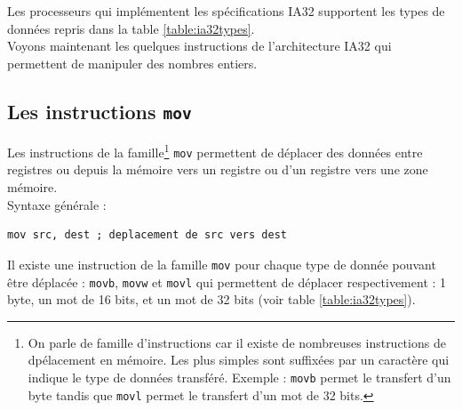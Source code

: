 Les processeurs qui implémentent les spécifications IA32 supportent les types de données repris dans la table \ref{table:ia32types}.
\\

Voyons maintenant les quelques instructions de l'architecture IA32 qui permettent de manipuler des nombres entiers.

\subsection{Les instructions \texttt{mov}}
Les instructions de la famille\footnote{On parle de famille d'instructions car il existe de nombreuses instructions de dpélacement en mémoire.
  Les plus simples sont suffixées par un caractère qui indique le type de données transféré.
Exemple : \texttt{movb} permet le transfert d'un byte tandis que \texttt{movl} permet le transfert d'un mot de 32 bits.} \texttt{mov} permettent de déplacer des données entre registres ou depuis la mémoire vers un registre ou d'un registre vers une zone mémoire.\\
Syntaxe générale :
\begin{lstlisting}[language={[x86masm]Assembler}]
mov src, dest ; deplacement de src vers dest
\end{lstlisting}
Il existe une instruction de la famille \texttt{mov} pour chaque type de donnée pouvant être déplacée : \texttt{movb}, \texttt{movw} et \texttt{movl} qui permettent de déplacer respectivement : 1 byte, un mot de 16 bits, et un mot de 32 bits (voir table \ref{table:ia32types}).
\\

